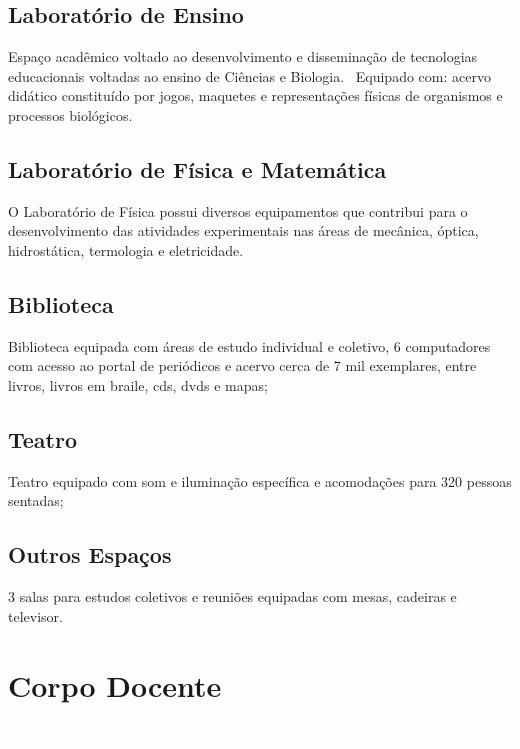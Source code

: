 \documentclass[11pt,fleqn]{book} %
\begin{document}
\section{Laboratório de Ensino}
Espaço acadêmico voltado ao desenvolvimento e disseminação de tecnologias educacionais voltadas ao ensino de Ciências e Biologia.  Equipado com: acervo didático constituído por jogos, maquetes e representações físicas de organismos e processos biológicos.

\section{Laboratório de Física e Matemática}
O Laboratório de Física possui diversos equipamentos que contribui para o desenvolvimento das atividades experimentais nas áreas de mecânica, óptica, hidrostática, termologia e eletricidade.

\section{Biblioteca}
Biblioteca equipada com áreas de estudo individual e coletivo, 6 computadores com acesso ao portal de periódicos e acervo cerca de 7 mil exemplares, entre livros, livros em braile, cds, dvds e mapas;

\section{Teatro}
Teatro equipado com som e iluminação específica e acomodações para 320 pessoas sentadas;

\section{Outros Espaços}
3 salas para estudos coletivos e reuniões equipadas com mesas, cadeiras e televisor.


\chapter{Corpo Docente}\label{docentes}
\vspace{6em}
\begin{flushright}
	\textit{\textcolor{white}{Um bonita citação...}}
\end{flushright}
\vspace{12em}
\end{document}
